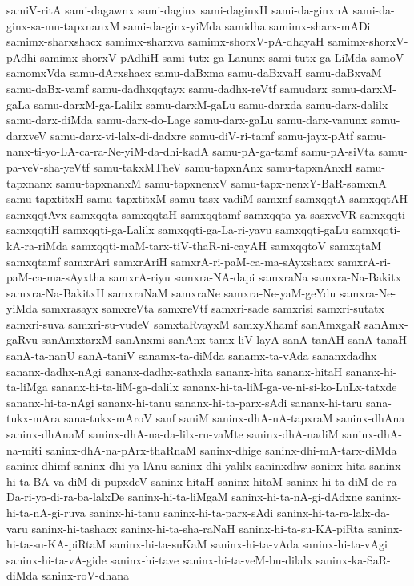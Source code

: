 {samiV-ritA
sami-dagawnx
sami-daginx
sami-daginxH
sami-da-ginxnA
sami-da-ginx-sa-mu-tapxnanxM
sami-da-ginx-yiMda
samidha
samimx-sharx-mADi
samimx-sharxshacx
samimx-sharxva
samimx-shorxV-pA-dhayaH
samimx-shorxV-pAdhi
samimx-shorxV-pAdhiH
sami-tutx-ga-Lanunx
sami-tutx-ga-LiMda
samoV
samomxVda
samu-dArxshacx
samu-daBxma
samu-daBxvaH
samu-daBxvaM
samu-daBx-vamf
samu-dadhxqqtayx
samu-dadhx-reVtf
samudarx
samu-darxM-gaLa
samu-darxM-ga-Lalilx
samu-darxM-gaLu
samu-darxda
samu-darx-dalilx
samu-darx-diMda
samu-darx-do-Lage
samu-darx-gaLu
samu-darx-vanunx
samu-darxveV
samu-darx-vi-lalx-di-dadxre
samu-diV-ri-tamf
samu-jayx-pAtf
samu-nanx-ti-yo-LA-ca-ra-Ne-yiM-da-dhi-kadA
samu-pA-ga-tamf
samu-pA-siVta
samu-pa-veV-sha-yeVtf
samu-takxMTheV
samu-tapxnAnx
samu-tapxnAnxH
samu-tapxnanx
samu-tapxnanxM
samu-tapxnenxV
samu-tapx-nenxY-BaR-samxnA
samu-tapxtitxH
samu-tapxtitxM
samu-tasx-vadiM
samxnf
samxqqtA
samxqqtAH
samxqqtAvx
samxqqta
samxqqtaH
samxqqtamf
samxqqta-ya-sasxveVR
samxqqti
samxqqtiH
samxqqti-ga-Lalilx
samxqqti-ga-La-ri-yavu
samxqqti-gaLu
samxqqti-kA-ra-riMda
samxqqti-maM-tarx-tiV-thaR-ni-cayAH
samxqqtoV
samxqtaM
samxqtamf
samxrAri
samxrAriH
samxrA-ri-paM-ca-ma-sAyxshacx
samxrA-ri-paM-ca-ma-sAyxtha
samxrA-riyu
samxra-NA-dapi
samxraNa
samxra-Na-Bakitx
samxra-Na-BakitxH
samxraNaM
samxraNe
samxra-Ne-yaM-geYdu
samxra-Ne-yiMda
samxrasayx
samxreVta
samxreVtf
samxri-sade
samxrisi
samxri-sutatx
samxri-suva
samxri-su-vudeV
samxtaRvayxM
samxyXhamf
sanAmxgaR
sanAmx-gaRvu
sanAmxtarxM
sanAnxmi
sanAnx-tamx-liV-layA
sanA-tanAH
sanA-tanaH
sanA-ta-nanU
sanA-taniV
sanamx-ta-diMda
sanamx-ta-vAda
sananxdadhx
sananx-dadhx-nAgi
sananx-dadhx-sathxla
sananx-hita
sananx-hitaH
sananx-hi-ta-liMga
sananx-hi-ta-liM-ga-dalilx
sananx-hi-ta-liM-ga-ve-ni-si-ko-LuLx-tatxde
sananx-hi-ta-nAgi
sananx-hi-tanu
sananx-hi-ta-parx-sAdi
sananx-hi-taru
sana-tukx-mAra
sana-tukx-mAroV
sanf
saniM
saninx-dhA-nA-tapxraM
saninx-dhAna
saninx-dhAnaM
saninx-dhA-na-da-lilx-ru-vaMte
saninx-dhA-nadiM
saninx-dhA-na-miti
saninx-dhA-na-pArx-thaRnaM
saninx-dhige
saninx-dhi-mA-tarx-diMda
saninx-dhimf
saninx-dhi-ya-lAnu
saninx-dhi-yalilx
saninxdhw
saninx-hita
saninx-hi-ta-BA-va-diM-di-pupxdeV
saninx-hitaH
saninx-hitaM
saninx-hi-ta-diM-de-ra-Da-ri-ya-di-ra-ba-lalxDe
saninx-hi-ta-liMgaM
saninx-hi-ta-nA-gi-dAdxne
saninx-hi-ta-nA-gi-ruva
saninx-hi-tanu
saninx-hi-ta-parx-sAdi
saninx-hi-ta-ra-lalx-da-varu
saninx-hi-tashacx
saninx-hi-ta-sha-raNaH
saninx-hi-ta-su-KA-piRta
saninx-hi-ta-su-KA-piRtaM
saninx-hi-ta-suKaM
saninx-hi-ta-vAda
saninx-hi-ta-vAgi
saninx-hi-ta-vA-gide
saninx-hi-tave
saninx-hi-ta-veM-bu-dilalx
saninx-ka-SaR-diMda
saninx-roV-dhana
}
